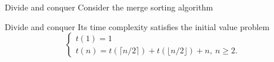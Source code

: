 \documentclass{beamer}
\begin{document}
\begin{frame}{Divide and conquer}
	Consider the merge sorting algorithm
	
\end{frame}

%

\begin{frame}{Divide and conquer}
	Its time complexity satisfies the initial value problem
	\begin{displaymath}
		\begin{cases}
			t(1)= 1\\
			t(n)= t\left( \lceil n/2 \rceil \right) +
			t\left( \lfloor n/2 \rfloor \right) + n,\ n \geq 2.
		\end{cases}
	\end{displaymath}
\end{frame}
\end{document}
